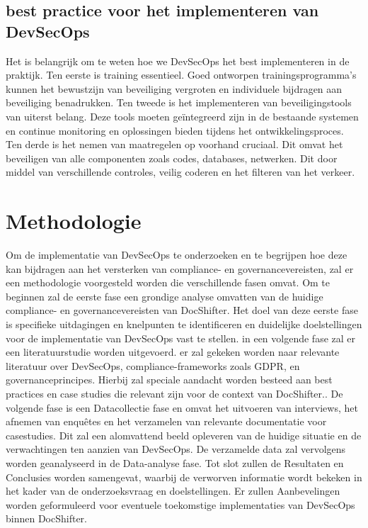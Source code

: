 \documentclass{hogent-article}
\begin{document}
    \subsection{best practice voor het implementeren van DevSecOps}
    Het is belangrijk om te weten hoe we DevSecOps het best implementeren in de praktijk. Ten eerste is training essentieel. Goed ontworpen trainingsprogramma's kunnen het bewustzijn van beveiliging vergroten en individuele bijdragen aan beveiliging benadrukken. \cite{RajaviDesai2021} Ten tweede is het implementeren van beveiligingstools van uiterst belang. Deze tools moeten geïntegreerd zijn in de bestaande systemen en continue monitoring en oplossingen bieden tijdens het ontwikkelingsproces. Ten derde is het nemen van maatregelen op voorhand cruciaal. Dit omvat het beveiligen van alle componenten zoals codes, databases, netwerken. Dit door middel van verschillende controles, veilig coderen en het filteren van het verkeer.
    
    
    \section{Methodologie}%
    \label{sec:methodologie}
    
    Om de implementatie van DevSecOps te onderzoeken en te begrijpen hoe deze kan bijdragen aan het versterken van compliance- en governancevereisten, zal er een methodologie voorgesteld worden die verschillende fasen omvat.
    Om te beginnen zal de eerste fase een grondige analyse omvatten van de huidige compliance- en governancevereisten van DocShifter. Het doel van deze eerste fase is specifieke uitdagingen en knelpunten te identificeren en duidelijke doelstellingen voor de implementatie van DevSecOps vast te stellen.
    in een volgende fase zal er een literatuurstudie worden uitgevoerd. er zal gekeken worden naar relevante literatuur over DevSecOps, compliance-frameworks zoals GDPR, en governanceprincipes. Hierbij zal speciale aandacht worden besteed aan best practices en case studies die relevant zijn voor de context van DocShifter..
    De volgende fase is een Datacollectie fase en omvat het uitvoeren van interviews, het afnemen van enquêtes en het verzamelen van relevante documentatie voor casestudies. Dit zal een alomvattend beeld opleveren van de huidige situatie en de verwachtingen ten aanzien van DevSecOps.
    De verzamelde data zal vervolgens worden geanalyseerd in de Data-analyse fase.
    Tot slot zullen de Resultaten en Conclusies worden samengevat, waarbij de verworven informatie wordt bekeken in het kader van de onderzoeksvraag en doelstellingen. Er zullen Aanbevelingen worden geformuleerd voor eventuele toekomstige implementaties van DevSecOps binnen DocShifter.
\end{document}
